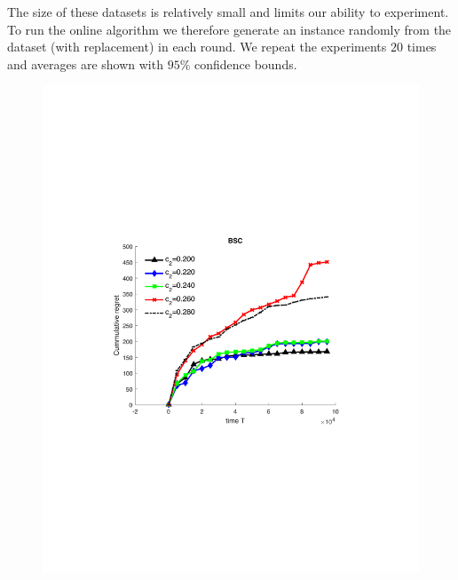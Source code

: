\documentclass[11pt]{article} %
\begin{document}
The size of these datasets is relatively small and limits our ability to experiment. To run the online algorithm we therefore generate an instance randomly from the dataset (with replacement) in each round. We repeat the experiments $20$ times and averages are shown with $95\%$ confidence bounds.

\begin{center}
\begin{figure}[!bt]
\begin{minipage}{8cm}
		\centering
		\includegraphics[scale=0.45]{BSC_SD}
				\vspace{-.3cm}

\end{minipage}
\end{figure}
\end{center}
\end{document}
